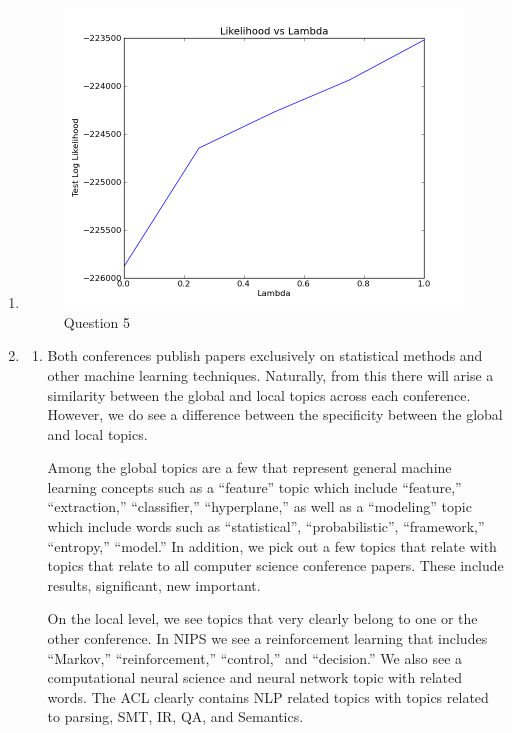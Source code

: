 \documentclass[11pt,a4paper]{article}
\begin{document}
\begin{enumerate}
\begin{figure}[H]
			\end{figure}
		\item
			\begin{figure}[H]
				\caption{Question 5}
				\begin{center}
					\includegraphics[scale=0.5]{../lambda_plot}
				\end{center}
			\end{figure}
		\item \begin{enumerate}
			\item Both conferences publish papers exclusively on statistical
			methods and other machine learning techniques. Naturally, from this
			there will arise a similarity between the global and local topics
			across each conference. However, we do see a difference between the 
			specificity between the global and local topics. 
			
			Among the global topics are a few that represent general machine
			learning concepts such as a ``feature'' topic which include
			``feature,'' ``extraction,'' ``classifier,'' ``hyperplane,'' as well as a ``modeling''
			topic which include words such as ``statistical'', ``probabilistic'', 
			``framework,''
			``entropy,'' ``model.'' In addition, we pick out a few topics that relate with
			topics that relate to all computer science conference papers. These
			include results, significant, new important. 
			
			On the local level, we see topics that very clearly belong to one or
			the other conference. In NIPS we see a reinforcement learning that includes
			``Markov,'' ``reinforcement,'' ``control,'' and 
			``decision.'' We also see a computational
			neural science and neural network topic with related words. The ACL
			clearly contains NLP related topics with topics related to parsing,
			SMT, IR, QA, and Semantics.
			

\end{enumerate}
\end{enumerate}
\end{document}
